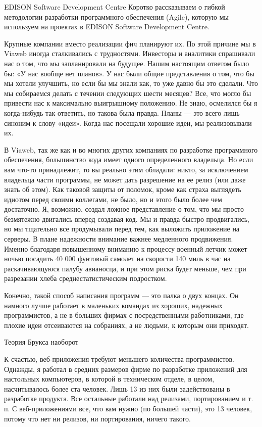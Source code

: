 \documentclass[ebook,12pt,oneside,openany]{memoir}
\begin{document}
EDISON Software Development Centre Коротко рассказываем о гибкой
методологии разработки программного обеспечения (Agile), которую мы
используем на проектах в EDISON Software Development Centre.




Крупные компании вместо реализации фич планируют их. По этой причине
мы в Viaweb иногда сталкивались с трудностями. Инвесторы и аналитики
спрашивали нас о том, что мы запланировали на будущее. Нашим настоящим
ответом было бы: «У нас вообще нет планов». У нас были общие
представления о том, что бы мы хотели улучшить, но если бы мы знали
как, то уже давно бы это сделали. Что мы собираемся делать с течении
следующих шести месяцев? Все, что могло бы привести нас к максимально
выигрышному положению. Не знаю, осмелился бы я когда-нибудь так
ответить, но такова была правда. Планы — это всего лишь синоним к
слову «идеи». Когда нас посещали хорошие идеи, мы реализовывали их.

В Viaweb, так же как и во многих других компаниях по разработке
программного обеспечения, большинство кода имеет одного определенного
владельца. Но если вам что-то принадлежит, то вы реально этим
обладали: никто, за исключением владельца части программы, не может
дать разрешение на ее релиз (или даже знать об этом). Как таковой
защиты от поломок, кроме как страха выглядеть идиотом перед своими
коллегами, не было, но и этого было более чем достаточно. Я, возможно,
создал ложное представление о том, что мы просто безмятежно двигались
вперед создавая код. Мы и правда быстро продвигались, но мы тщательно
все продумывали перед тем, как выложить приложение на серверы. В плане
надежности внимание важнее медленного продвижения. Именно благодаря
повышенному вниманию к процессу военный летчик может ночью посадить 40
000 фунтовый самолет на скорости 140 миль в час на раскачивающуюся
палубу авианосца, и при этом риска будет меньше, чем при разрезании
хлеба среднестатистическим подростком.

Конечно, такой способ написания программ — это палка о двух концах. Он
намного лучше работает в маленьких командах из хороших, надежных
программистов, а не в больших фирмах с посредственными работниками,
где плохие идеи отсеиваются на собраниях, а не людьми, к которым они
приходят.

Теория Брукса наоборот


К счастью, веб-приложения требуют меньшего количества программистов.
Однажды, я работал в средних размеров фирме по разработке приложений
для настольных компьютеров, в которой в техническом отделе, в целом,
насчитывалось более ста человек. Лишь 13 из них были задействованы в
разработке продукта. Все остальные работали над релизами,
портированием и т. п. С веб-приложениями все, что вам нужно (по
большей части), это 13 человек, потому что нет ни релизов, ни
портирования, ничего такого.
\end{document}
